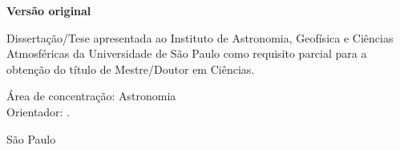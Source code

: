 
\thispagestyle{empty}%
\begin{center}
  \authorname

  \vspace{3cm}

  \textbf{\thesistitle}

  \vspace{3cm}

  \textbf{Versão original}

  \vspace{3cm}

  \begin{flushright}
    \begin{minipage}{.6\linewidth}
      Dissertação/Tese apresentada ao Instituto de Astronomia, \mbox{Geofísica} e Ciências Atmosféricas da Universidade de São Paulo como requisito parcial para a obtenção do título de Mestre/Doutor em \mbox{Ciências}.
      
      \vspace{0.5cm}
      
      Área de concentração: Astronomia
      \\
      Orientador: \supervisorname.
    \end{minipage}
  \end{flushright}
  \vfill
  
  São Paulo\\
  \the\year\\

\end{center}

\newpage
\shipout\null %

\restoregeometry %
